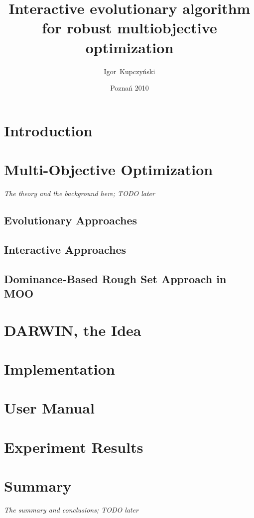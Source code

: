 \documentclass[a4paper,english,thesis]{dcsbook}
\author{Igor~Kupczy\'nski}
\date{Pozna\'n 2010}
\title{Interactive evolutionary algorithm \\ for robust multiobjective
  optimization}
\begin{document}
\maketitle
\frontmatter
\tableofcontents{}
\mainmatter

\chapter{Introduction}

\chapter{Multi-Objective Optimization}
\textit{The theory and the background here; TODO later}
\section{Evolutionary Approaches}
\section{Interactive Approaches}
\section{Dominance-Based Rough Set Approach in MOO}

\chapter{DARWIN, the Idea}

\chapter{Implementation}

\chapter{User Manual}

\chapter{Experiment Results}


\chapter{Summary}
\textit{The summary and conclusions; TODO later}

\backmatter



\end{document}
